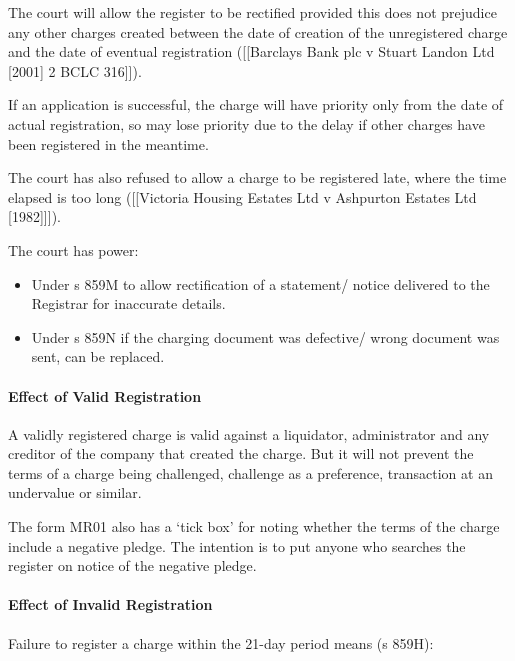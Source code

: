\documentclass[
]{article}
\providecommand{\tightlist}{%
  \setlength{\itemsep}{0pt}\setlength{\parskip}{0pt}}
\begin{document}
The court will allow the register to be rectified provided this does not
prejudice any other charges created between the date of creation of the
unregistered charge and the date of eventual registration
({[}{[}Barclays Bank plc v Stuart Landon Ltd {[}2001{]} 2 BCLC
316{]}{]}).

If an application is successful, the charge will have priority only from
the date of actual registration, so may lose priority due to the delay
if other charges have been registered in the meantime.

The court has also refused to allow a charge to be registered late,
where the time elapsed is too long ({[}{[}Victoria Housing Estates Ltd v
Ashpurton Estates Ltd {[}1982{]}{]}{]}).

The court has power:

\begin{itemize}
\tightlist
\item
  Under s 859M to allow rectification of a statement/ notice delivered
  to the Registrar for inaccurate details.
\item
  Under s 859N if the charging document was defective/ wrong document
  was sent, can be replaced.
\end{itemize}

\hypertarget{effect-of-valid-registration}{%
\paragraph{Effect of Valid
Registration}\label{effect-of-valid-registration}}

A validly registered charge is valid against a liquidator, administrator
and any creditor of the company that created the charge. But it will not
prevent the terms of a charge being challenged, challenge as a
preference, transaction at an undervalue or similar.

The form MR01 also has a `tick box' for noting whether the terms of the
charge include a negative pledge. The intention is to put anyone who
searches the register on notice of the negative pledge.

\hypertarget{effect-of-invalid-registration}{%
\paragraph{Effect of Invalid
Registration}\label{effect-of-invalid-registration}}

Failure to register a charge within the 21-day period means (s 859H):
\end{document}
